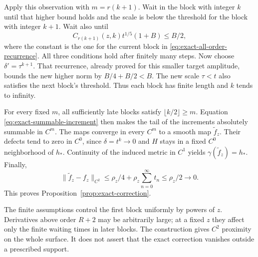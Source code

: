 Apply this observation with $m=r(k+1)$.  Wait in the block with
integer $k$ until that higher bound holds and the scale is below the
threshold for the block with integer $k+1$.  Wait also until
\[
 C_{r(k+1)}(z,k)t^{1/5}(1+B)\le B/2,
\]
where the constant is the one for the current block in
\eqref{eq:exact-all-order-recurrence}.  All three conditions hold after
finitely many steps.  Now choose $\delta'=\tau^{k+1}$.  That recurrence,
already proved for this smaller target amplitude, bounds the new higher
norm by $B/4+B/2<B$.  The new scale $\tau<t$ also satisfies the next
block's threshold.  Thus each block has finite length and $k$ tends to
infinity.

For every fixed $m$, all sufficiently late blocks satisfy
$\lfloor k/2\rfloor\ge m$.  Equation
\eqref{eq:exact-summable-increment} then makes the tail of the
increments absolutely summable in $C^m$.  The maps converge in every
$C^m$ to a smooth map $\widetilde f_z$.  Their defects tend to zero in
$C^0$, since $\delta=t^k\to0$ and $H$ stays in a fixed $C^0$
neighborhood of $h_*$.  Continuity of the induced metric in $C^1$
yields $\gamma(\widetilde f_z)=h_*$.  Finally,
\[
 \|\widetilde f_z-f_z\|_{C^2}
 \le\rho_z/4+\rho_z\sum_{n=0}^\infty t_n
 \le\rho_z/2\longrightarrow0.
\]
This proves Proposition~\ref{prop:exact-correction}.

\begin{remark}
The finite assumptions control the first block uniformly by powers
of $z$.  Derivatives above order $R+2$ may be arbitrarily large; at a
fixed $z$ they affect only the finite waiting times in later blocks.
The construction gives $C^2$ proximity on the whole surface.  It does
not assert that the exact correction vanishes outside a prescribed
support.
\end{remark}
